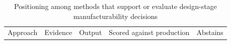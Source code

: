 \documentclass[pdflatex,sn-basic,lineno]{sn-jnl}
\newcommand{\tabsize}{\fontsize{8}{9.5}\selectfont}
\providecommand{\DIFaddbeginFL}{} %
\providecommand{\DIFdelbeginFL}{} %
\providecommand{\DIFdelendFL}{} %
\newcommand{\DIFscaledelfig}{0.5}
\newlength{\DIFdelgraphicswidth} %
\newlength{\DIFdelgraphicsheight} %
\newcommand{\DIFaddincludegraphics}[2][]{{\color{blue}\fbox{\DIFOincludegraphics[#1]{#2}}}} %
\newcommand{\DIFdelincludegraphics}[2][]{%
\sbox{\DIFdelgraphicsbox}{\DIFOincludegraphics[#1]{#2}}%
\settoboxwidth{\DIFdelgraphicswidth}{\DIFdelgraphicsbox} %
\settoboxtotalheight{\DIFdelgraphicsheight}{\DIFdelgraphicsbox} %
\scalebox{\DIFscaledelfig}{%
\parbox[b]{\DIFdelgraphicswidth}{\usebox{\DIFdelgraphicsbox}\\[-\baselineskip] \rule{\DIFdelgraphicswidth}{0em}}\llap{\resizebox{\DIFdelgraphicswidth}{\DIFdelgraphicsheight}{%
\setlength{\unitlength}{\DIFdelgraphicswidth}%
\begin{picture}(1,1)%
\thicklines\linethickness{2pt} %
{\color[rgb]{1,0,0}\put(0,0){\framebox(1,1){}}}%
{\color[rgb]{1,0,0}\put(0,0){\line( 1,1){1}}}%
{\color[rgb]{1,0,0}\put(0,1){\line(1,-1){1}}}%
\end{picture}%
}\hspace*{3pt}}} %
} %
\DeclareRobustCommand{\DIFaddbeginFL}{\DIFOaddbeginFL \let\includegraphics\DIFaddincludegraphics} %
\DeclareRobustCommand{\DIFdelbeginFL}{\DIFOdelbeginFL \let\includegraphics\DIFdelincludegraphics} %
\DeclareRobustCommand{\DIFdelendFL}{\DIFOaddendFL \let\includegraphics\DIFOincludegraphics} %
\begin{document}
\begin{table}[t]
\tabsize
\setlength{\tabcolsep}{3.5pt}
\caption{Positioning among methods that support or evaluate design-stage manufacturability decisions}\label{tab:positioning}
\DIFdelbeginFL %
\DIFdelendFL \DIFaddbeginFL \begin{tabular}{@{}L{3.2cm}L{2.5cm}L{2.9cm}L{1.9cm}L{1.5cm}@{}}
\toprule
Approach & Evidence & Output & Scored against production & Abstains \\

\end{tabular}
\end{table}
\end{document}
